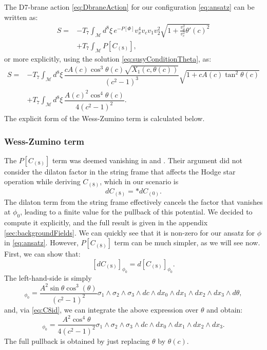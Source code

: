 The D7-brane action \eqref{eq:DbraneAction} for our configuration \eqref{eq:ansatz} can be written as:
\begin{align} \label{eq:ActionWithTheta'}
 S  = & -T_7 \int_\mathcal{M} d^8\xi \, e^{-P[\Phi] } v_x^4 v_c v_1 v_2^2 \sqrt{1+\frac{v_\theta^2}{v_c^2}\theta'(c)^2}  \nonumber \\
      & + T_7\int _\mathcal{M} P[C_{(8)}],
\end{align}
or more explicitly, using the solution \eqref{eq:susyConditionTheta}, as:
\begin{align}\label{eq:ActionWithTheta}
 S = & -T_7 \int_\mathcal{M} d^8\xi \, \dfrac{c A(c) \cos^3\theta (c) \sqrt{X_1(c, \theta(c))}}{\left(c^2-1\right)^3} \sqrt{1+ c A(c) \tan^2\theta(c)} \nonumber \\
     & +T_7\int _\mathcal{M} d^8\xi \, \dfrac{A(c)^2 \cos^4\theta(c)}{4 \left(c^2-1\right)^2}.
\end{align}
The explicit form of the Wess-Zumino term is calculated below.

\subsubsection{Wess-Zumino term}
The $P[C_{(8)}]$ term was deemed vanishing in \cite{Albash:2011nw} and \cite{Evans:2005ti}. Their argument did not consider the dilaton factor in the string frame that affects the Hodge star operation while deriving $C_{(8)}$, which in our scenario is
\begin{equation}
 dC_{(8)} = \ast dC_{(0)}.
\end{equation}
The dilaton term from the string frame effectively cancels the factor that vanishes at $\phi_0$, leading to a finite value for the pullback of this potential. We decided to compute it explicitly, and the full result is given in the appendix \ref{sec:backgroundFields}. We can quickly see that it is non-zero for our ansatz for $\phi$ in \eqref{eq:ansatz}. However, $P[C_{(8)}]$ term can be much simpler, as we will see now. First, we can show that:
\begin{equation}\label{eq:C8id}
 [d C_{(8)}]_{\phi_0} = d [C_{(8)}]_{\phi_0}.
\end{equation}
The left-hand-side is simply
\begin{equation}
 [d C_{(8)}]_{\phi_0}  = \dfrac{A^2 \sin\theta \cos^3(\theta)}{\left(c^2-1\right)^2} 
\sigma_1 \wedge \sigma_2 \wedge \sigma_3 \wedge dc  \wedge dx_0 \wedge dx_1 \wedge dx_2 \wedge dx_3 \wedge d\theta,
\end{equation}
and, via \eqref{eq:C8id}, we can integrate the above expression over $\theta$ and obtain:
\begin{equation}
[C_{(8)}]_{\phi_0} = \dfrac{A^2 \cos^4\theta}{4 \left(c^2-1\right)^2} \sigma_1 \wedge \sigma_2 \wedge \sigma_3 \wedge dc \wedge dx_0 \wedge dx_1 \wedge dx_2 \wedge dx_3.
\end{equation}
The full pullback is obtained by just replacing $\theta$ by $\theta(c)$.




